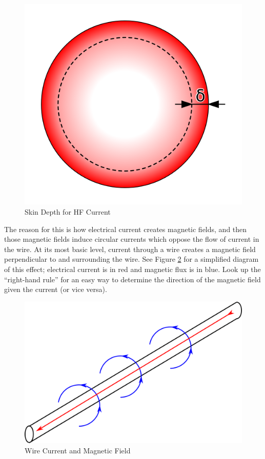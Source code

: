 \begin{figure}[h]
\centering
\includegraphics[scale=0.35]{skin_depth.png}
\caption{Skin Depth for HF Current}\label{skin_depth}
\end{figure}

The reason for this is how electrical current creates magnetic fields, and then those magnetic fields induce circular currents which oppose the flow of current in the wire. At its most basic level, current through a wire creates a magnetic field perpendicular to and surrounding the wire. See Figure \ref{wire_mag_field} for a simplified diagram of this effect; electrical current is in red and magnetic flux is in blue. Look up the ``right-hand rule'' for an easy way to determine the direction of the magnetic field given the current (or vice versa).

\begin{figure}[h]
\centering
\includegraphics[scale=2]{wire_mag_field.png}
\caption{Wire Current and Magnetic Field}\label{wire_mag_field}
\end{figure}

